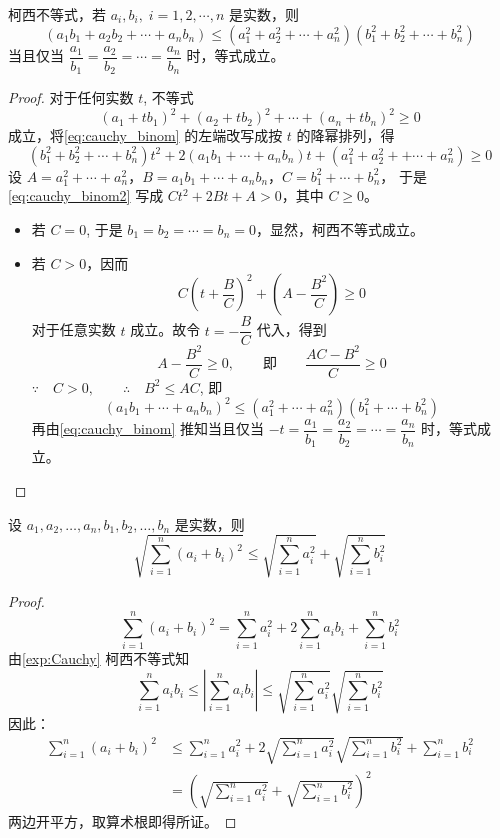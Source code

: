 \begin{example}\label{exp:Cauchy}
  柯西不等式，若 $a_i,b_i,\; i=1,2,\cdots ,n$ 是实数，则
\[(a_1b_1+a_2b_2+\cdots +a_nb_n)\leqslant (a_1^2+a_2^2+\cdots +a_n^2)(b_1^2+b_2^2+\cdots+b_n^2)\]
当且仅当
$\dfrac{a_1}{b_1}=\dfrac{a_2}{b_2}=\cdots=\dfrac{a_n}{b_n}$ 时，等式成立。
\end{example}

\begin{proof}
对于任何实数 $t$, 不等式
\begin{equation}
  \label{eq:cauchy_binom}
  (a_1+tb_1)^2+(a_2+tb_2)^2+\cdots +(a_n+tb_n)^2\geqslant 0
\end{equation}
成立，将\cref{eq:cauchy_binom} 的左端改写成按 $t$ 的降幂排列，得
\begin{equation}
  \label{eq:cauchy_binom2}
   ( b^2_1+b^2_2+\cdots +b^2_n)t^2+2(a_1b_1+\cdots +a_nb_n)t+(a^2_1+a_2^2+
+\cdots +a_n^2)\geqslant 0
\end{equation} 
设 $A=a^2_1+\cdots +a_n^2$，$B=a_1b_1+\cdots +a_nb_n$，$C=b^2_1+\cdots +b^2_n$，
于是\cref{eq:cauchy_binom2} 写成 $Ct^2+2Bt+A>0$，其中 $C\geqslant 0$。
\begin{itemize}
  \item 若 $C=0$, 于是 $b_1=b_2=\cdots =b_n=0$，显然，柯西不等式成立。
  \item 若 $C>0$，因而 
  \[C\left(t+\frac{B}{C}\right)^2+\left(A-\frac{B^2}{C}\right)\geqslant 0\]
  对于任意实数 $t$ 成立。故令 $t=-\dfrac{B}{C}$ 代入，得到
  \[A-\frac{B^2}{C}\geqslant 0,\qquad \text{即}\qquad \frac{AC-B^2}{C}\geqslant 0\]
  $\because\quad C>0,\qquad \therefore\quad B^2\leqslant AC$, 即
\[(a_1b_1+\cdots +a_nb_n)^2\leqslant (a^2_1+\cdots +a^2_n)(b^2_1+\cdots +b^2_n)\]
再由\cref{eq:cauchy_binom} 推知当且仅当 $-t=\dfrac{a_1}{b_1}=\dfrac{a_2}{b_2}=\cdots=\dfrac{a_n}{b_n}$ 时，等式成立。
\end{itemize}
\end{proof}

\begin{example}
  设 $a_1,a_2,\ldots,a_n,b_1,b_2,\ldots,b_n$ 是实数，则
\[\sqrt{\sum^n_{i=1}(a_i+b_i)^2}\leqslant \sqrt{\sum^n_{i=1}a^2_i}+\sqrt{\sum^n_{i=1}b^2_i}\]
\end{example}

\begin{proof}
 \[   \sum^n_{i=1}(a_i+b_i)^2=\sum^n_{i=1}a_i^2+2\sum^n_{i=1}a_ib_i+\sum^n_{i=1}b_i^2\]
由\cref{exp:Cauchy} 柯西不等式知
\[\sum^n_{i=1}a_ib_i\le\left|\sum^n_{i=1}a_ib_i\right|\leqslant \sqrt{\sum^n_{i=1}a_i^2}\sqrt{\sum^n_{i=1}b_i^2}\]
因此：
\[\begin{split}
    \sum^n_{i=1}(a_i+b_i)^2&\leqslant \sum^n_{i=1}a_i^2+2\sqrt{\sum^n_{i=1}a_i^2}\sqrt{\sum^n_{i=1}b_i^2}+\sum^n_{i=1}b_i^2\\
    &=\left(\sqrt{\sum^n_{i=1}a^2_i}+\sqrt{\sum^n_{i=1}b^2_i}\right)^2
\end{split}\]
两边开平方，取算术根即得所证。
\end{proof}    

